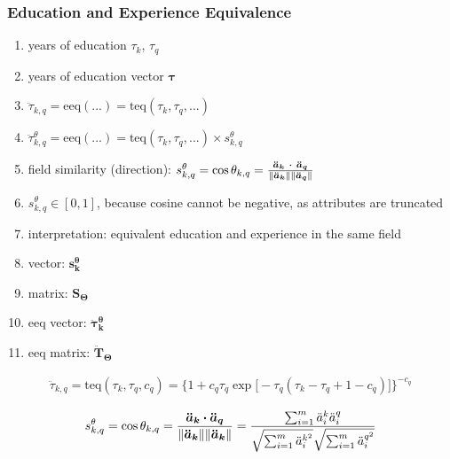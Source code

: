 \documentclass{elsarticle} %
\begin{document}
\subsubsection{Education and Experience Equivalence}
\begin{enumerate}
    \item years of education $\tau_k$, $\tau_q$
    \item years of education vector $\boldsymbol{\tau}$
    \item $\ddot{\tau}_{k,q} = \text{eeq}(...) = \text{teq}(\tau_k, \tau_q, ...)$
    \item $\ddot{\tau}_{k,q}^{\theta} = \text{eeq}(...) = \text{teq}(\tau_k, \tau_q, ...) \times s_{k,q}^{\theta}$
    \item field similarity (direction): $s_{k,q}^{\theta} = \cos\theta_{k,q} = \frac{
                  \boldsymbol{\ddot{a}_{k} \ \dotproduct\ \boldsymbol{\ddot{a}_{q}}} }{
                  \norm{\boldsymbol{\ddot{a}_{k}}} \norm{\boldsymbol{\ddot{a}_{q}}} } $
    \item $s_{k,q}^{\theta} \in [0,1]$, because cosine cannot be negative, as attributes are truncated
    \item interpretation: equivalent education and experience in the same field
    \item vector: $\boldsymbol{s_{k}^{\theta}}$
    \item matrix: $\textbf{S}_{\mathbf{\Theta}}$
    \item eeq vector: $\boldsymbol{\ddot{\tau}_{k}^{\theta}}$
    \item eeq matrix: $\boldsymbol{\ddot{\textbf{T}}_{\mathbf{\Theta}}}$
\end{enumerate}
\begin{gather}
    \ddot{\tau}_{k,q} =
    \text{teq}(\tau_k,\tau_q,c_q) =
    \big\{
        1 + c_q \tau_q 
        \exp\big[
            -\tau_q (
                    \tau_k - \tau_q + 1 - c_q
                )
        \big]
    \big\} ^ {-c_q}
\end{gather}

\begin{gather}
    s_{k,q}^{\theta} = 
    \cos\theta_{k,q} = 
    \frac{
        \boldsymbol{\ddot{a}_k}
        \dotproduct
        \boldsymbol{\ddot{a}_q}
    }{
        \norm{\boldsymbol{\ddot{a}_k}}
        \norm{\boldsymbol{\ddot{a}_k}}
    } =
    \frac{
        \sum_{i=1}^{m}{
            \ddot{a}_{i}^{k}
            \ddot{a}_{i}^{q}
        }
    }{
        \sqrt{
            \sum_{i=1}^{m}{
                \ddot{a}_{i}^{{k} ^ 2}
            }
        }
        \sqrt{
            \sum_{i=1}^{m}{
                \ddot{a}_{i}^{{q} ^ 2}
            }
        }
    }
\end{gather}
\end{document}
